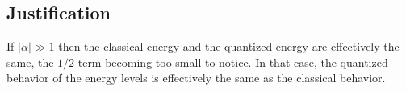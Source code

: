 \subsection{Justification}
If $\lvert\alpha\rvert\gg1$ then the classical energy and the quantized energy are effectively the same, the $1/2$ term becoming too small to notice. In that case, the quantized behavior of the energy levels is effectively the same as the classical behavior.